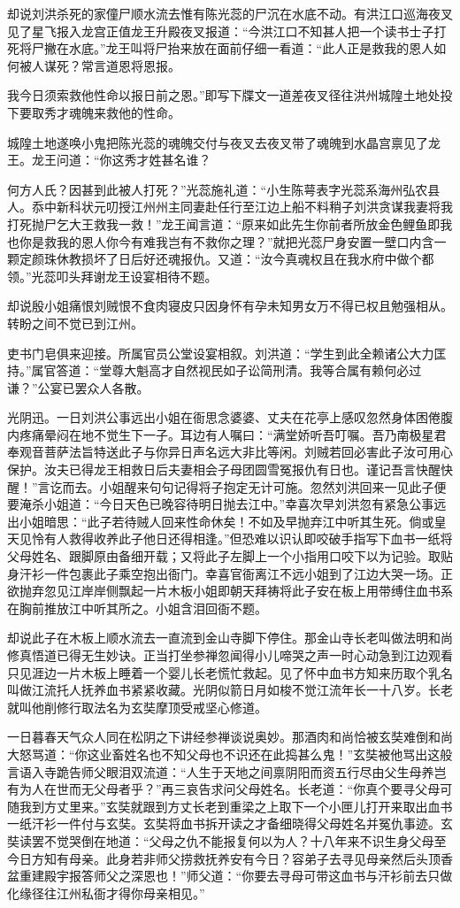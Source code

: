 \documentclass[12pt,UTF8]{ctexbook}
\begin{document}
却说刘洪杀死的家僮尸顺水流去惟有陈光蕊的尸沉在水底不动。有洪江口巡海夜叉见了星飞报入龙宫正值龙王升殿夜叉报道：“今洪江口不知甚人把一个读书士子打死将尸撇在水底。”龙王叫将尸抬来放在面前仔细一看道：“此人正是救我的恩人如何被人谋死？常言道恩将恩报。

我今日须索救他性命以报日前之恩。”即写下牒文一道差夜叉径往洪州城隍土地处投下要取秀才魂魄来救他的性命。

城隍土地遂唤小鬼把陈光蕊的魂魄交付与夜叉去夜叉带了魂魄到水晶宫禀见了龙王。龙王问道：“你这秀才姓甚名谁？

何方人氏？因甚到此被人打死？”光蕊施礼道：“小生陈萼表字光蕊系海州弘农县人。忝中新科状元叨授江州州主同妻赴任行至江边上船不料稍子刘洪贪谋我妻将我打死抛尸乞大王救我一救！”龙王闻言道：“原来如此先生你前者所放金色鲤鱼即我也你是救我的恩人你今有难我岂有不救你之理？”就把光蕊尸身安置一壁口内含一颗定颜珠休教损坏了日后好还魂报仇。又道：“汝今真魂权且在我水府中做个都领。”光蕊叩头拜谢龙王设宴相待不题。

却说殷小姐痛恨刘贼恨不食肉寝皮只因身怀有孕未知男女万不得已权且勉强相从。转盼之间不觉已到江州。

吏书门皂俱来迎接。所属官员公堂设宴相叙。刘洪道：“学生到此全赖诸公大力匡持。”属官答道：“堂尊大魁高才自然视民如子讼简刑清。我等合属有赖何必过谦？”公宴已罢众人各散。

光阴迅。一日刘洪公事远出小姐在衙思念婆婆、丈夫在花亭上感叹忽然身体困倦腹内疼痛晕闷在地不觉生下一子。耳边有人嘱曰：“满堂娇听吾叮嘱。吾乃南极星君奉观音菩萨法旨特送此子与你异日声名远大非比等闲。刘贼若回必害此子汝可用心保护。汝夫已得龙王相救日后夫妻相会子母团圆雪冤报仇有日也。谨记吾言快醒快醒！”言讫而去。小姐醒来句句记得将子抱定无计可施。忽然刘洪回来一见此子便要淹杀小姐道：“今日天色已晚容待明日抛去江中。”幸喜次早刘洪忽有紧急公事远出小姐暗思：“此子若待贼人回来性命休矣！不如及早抛弃江中听其生死。倘或皇天见怜有人救得收养此子他日还得相逢。”但恐难以识认即咬破手指写下血书一纸将父母姓名、跟脚原由备细开载；又将此子左脚上一个小指用口咬下以为记验。取贴身汗衫一件包裹此子乘空抱出衙门。幸喜官衙离江不远小姐到了江边大哭一场。正欲抛弃忽见江岸岸侧飘起一片木板小姐即朝天拜祷将此子安在板上用带缚住血书系在胸前推放江中听其所之。小姐含泪回衙不题。

却说此子在木板上顺水流去一直流到金山寺脚下停住。那金山寺长老叫做法明和尚修真悟道已得无生妙诀。正当打坐参禅忽闻得小儿啼哭之声一时心动急到江边观看只见涯边一片木板上睡着一个婴儿长老慌忙救起。见了怀中血书方知来历取个乳名叫做江流托人抚养血书紧紧收藏。光阴似箭日月如梭不觉江流年长一十八岁。长老就叫他削修行取法名为玄奘摩顶受戒坚心修道。

一日暮春天气众人同在松阴之下讲经参禅谈说奥妙。那酒肉和尚恰被玄奘难倒和尚大怒骂道：“你这业畜姓名也不知父母也不识还在此捣甚么鬼！”玄奘被他骂出这般言语入寺跪告师父眼泪双流道：“人生于天地之间禀阴阳而资五行尽由父生母养岂有为人在世而无父母者乎？”再三哀告求问父母姓名。长老道：“你真个要寻父母可随我到方丈里来。”玄奘就跟到方丈长老到重梁之上取下一个小匣儿打开来取出血书一纸汗衫一件付与玄奘。玄奘将血书拆开读之才备细晓得父母姓名并冤仇事迹。玄奘读罢不觉哭倒在地道：“父母之仇不能报复何以为人？十八年来不识生身父母至今日方知有母亲。此身若非师父捞救抚养安有今日？容弟子去寻见母亲然后头顶香盆重建殿宇报答师父之深恩也！”师父道：“你要去寻母可带这血书与汗衫前去只做化缘径往江州私衙才得你母亲相见。”
\end{document}
